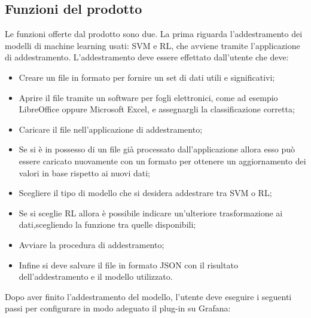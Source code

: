 \documentclass[../analisi-dei-requisiti.tex]{subfiles}
\begin{document}
\subsection{Funzioni del prodotto}
\label{subs:funzioni_del_prodotto}
	Le funzioni offerte dal prodotto sono due.
	La prima riguarda l'addestramento dei modelli di machine learning usati: SVM e RL, che avviene tramite l'applicazione di addestramento. L'addestramento deve essere effettato dall'utente che deve: 
	\begin{itemize}
		\item{Creare un file in formato  per fornire un set di dati utili e significativi;}
		\item{Aprire il file tramite un software per fogli elettronici, come ad esempio LibreOffice oppure Microsoft Excel, e assegnargli la classificazione corretta;}
		\item{Caricare il file nell'applicazione di addestramento;}
		\item{Se si è in possesso di un file già processato dall'applicazione allora esso può essere caricato nuovamente con un formato  per ottenere un aggiornamento dei valori in base rispetto ai nuovi dati;}
		\item{Scegliere il tipo di modello che si desidera addestrare tra SVM o RL;}
		\item{Se si sceglie RL allora è possibile indicare un'ulteriore trasformazione ai dati,scegliendo la funzione tra quelle disponibili;}
		\item{Avviare la procedura di addestramento;}
		\item{Infine si deve salvare il file in formato JSON con il risultato dell'addestramento e il modello utilizzato.}
	\end{itemize}
	Dopo aver finito l'addestramento del modello, l'utente deve eseguire i seguenti passi per configurare in modo adeguato il plug-in su Grafana:
\end{document}
